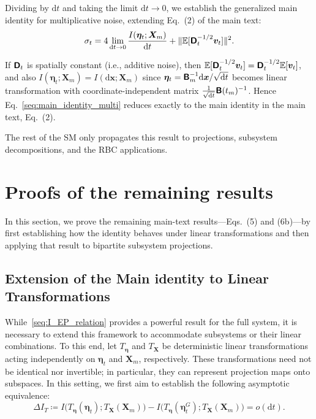 Dividing by $\mathrm dt$ and taking the limit $\mathrm dt \to 0$, we establish the generalized main identity for multiplicative noise, extending Eq.~(2) of the main text:
\begin{equation}
    \sigma_t
    =4\lim_{\mathrm dt\rightarrow0}
    \frac{I(\bm\eta_t;\bm X_m)}{\mathrm dt}
    +\|\mathbb E[\boldsymbol{\mathsf{D}}_t^{-1/2}\bm v_t]\|^2.
    \label{seq:main_identity_multi}
\end{equation}

If $\boldsymbol{\mathsf{D}}_t$ is spatially constant (i.e., additive noise), then $\mathbb E[\boldsymbol{\mathsf{D}}_t^{-1/2}\bm v_t] = \boldsymbol{\mathsf{D}}_t^{-1/2}\mathbb E[\bm v_t]$, and also $I(\bm\eta_t;\bm X_m)=I(\mathrm d\bm x;\bm X_m)$ since $\bm\eta_t=\boldsymbol{\mathsf{B}}_m^{-1}\mathrm d\bm x/\sqrt{\mathrm dt}$ becomes linear transformation with coordinate-independent matrix $\frac{1}{\sqrt{\mathrm dt}}\boldsymbol{\mathsf{B}}(t_m)^{-1}$. Hence Eq.~\eqref{seq:main_identity_multi} reduces exactly to the main identity in the main text, Eq.~(2).

The rest of the SM only propagates this result to projections, subsystem decompositions, and the RBC applications.

\section{Proofs of the remaining results}
\vspace*{-0.6\baselineskip}

In this section, we prove the remaining main-text results---Eqs.~(5) and (6b)---by first establishing how the identity behaves under linear transformations and then applying that result to bipartite subsystem projections.

\subsection{Extension of the Main identity to Linear Transformations}
\vspace*{-0.6\baselineskip}

While~\eqref{seq:I_EP_relation} provides a powerful result for the full system, it is necessary to extend this framework to accommodate subsystems or their linear combinations. To this end, let $T_{\bm\eta}$ and $T_{\bm X}$ be deterministic linear transformations acting independently on $\bm\eta_t$ and $\bm X_m$, respectively. These transformations need not be identical nor invertible; in particular, they can represent projection maps onto subspaces. In this setting, we first aim to establish the following asymptotic equivalence:
\begin{equation}
    \Delta I_T\coloneq
    I\big(T_{\bm\eta}(\bm\eta_t);T_{\bm X}(\bm X_m)\big)
    -I\big(T_{\bm\eta}(\bm\eta_t^G);T_{\bm X}(\bm X_m)\big)
    =o(\mathrm dt).
    \label{seq:deltaI_T_odt}
\end{equation}

